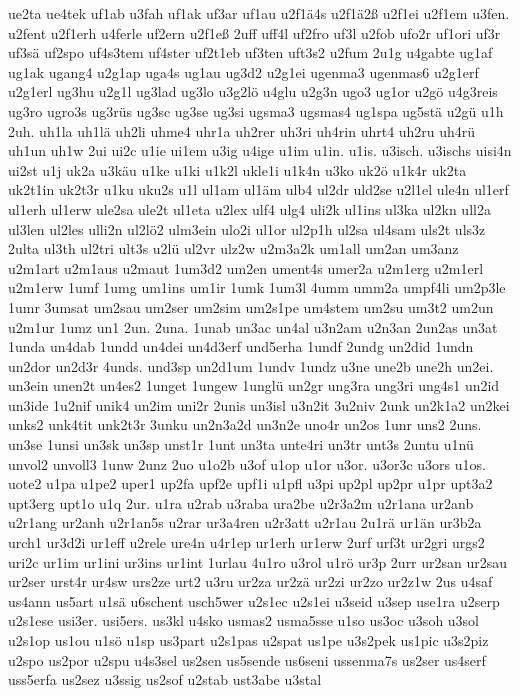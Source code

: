 {ue2ta
ue4tek
uf1ab
u3fah
uf1ak
uf3ar
uf1au
u2f1ä4s
u2f1ä2ß
u2f1ei
u2f1em
u3fen.
u2fent
u2f1erh
u4ferle
uf2ern
u2f1eß
2uff
uff4l
uf2fro
uf3l
u2fob
ufo2r
uf1ori
uf3r
uf3sä
uf2spo
uf4s3tem
uf4ster
uf2t1eb
uf3ten
uft3s2
u2fum
2u1g
u4gabte
ug1af
ug1ak
ugang4
u2g1ap
uga4s
ug1au
ug3d2
u2g1ei
ugenma3
ugenmas6
u2g1erf
u2g1erl
ug3hu
u2g1l
ug3lad
ug3lo
u3g2lö
u4glu
u2g3n
ugo3
ug1or
u2gö
u4g3reis
ug3ro
ugro3s
ug3rüs
ug3sc
ug3se
ug3si
ugsma3
ugsmas4
ug1spa
ug5stä
u2gü
u1h
2uh.
uh1la
uh1lä
uh2li
uhme4
uhr1a
uh2rer
uh3ri
uh4rin
uhrt4
uh2ru
uh4rü
uh1un
uh1w
2ui
ui2c
u1ie
ui1em
u3ig
u4ige
u1im
u1in.
u1is.
u3isch.
u3ischs
uisi4n
ui2st
u1j
uk2a
u3käu
u1ke
u1ki
u1k2l
ukle1i
u1k4n
u3ko
uk2ö
u1k4r
uk2ta
uk2t1in
uk2t3r
u1ku
uku2s
u1l
ul1am
ul1äm
ulb4
ul2dr
uld2se
u2l1el
ule4n
ul1erf
ul1erh
ul1erw
ule2sa
ule2t
ul1eta
u2lex
ulf4
ulg4
uli2k
ul1ins
ul3ka
ul2kn
ull2a
ul3len
ul2les
ulli2n
ul2lö2
ulm3ein
ulo2i
ul1or
ul2p1h
ul2sa
ul4sam
uls2t
uls3z
2ulta
ul3th
ul2tri
ult3s
u2lü
ul2vr
ulz2w
u2m3a2k
um1all
um2an
um3anz
u2m1art
u2m1aus
u2maut
1um3d2
um2en
ument4s
umer2a
u2m1erg
u2m1erl
u2m1erw
1umf
1umg
um1ins
um1ir
1umk
1um3l
4umm
umm2a
umpf4li
um2p3le
1umr
3umsat
um2sau
um2ser
um2sim
um2s1pe
um4stem
um2su
um3t2
um2un
u2m1ur
1umz
un1
2un.
2una.
1unab
un3ac
un4al
u3n2am
u2n3an
2un2as
un3at
1unda
un4dab
1undd
un4dei
un4d3erf
und5erha
1undf
2undg
un2did
1undn
un2dor
un2d3r
4unds.
und3sp
un2d1um
1undv
1undz
u3ne
une2b
une2h
un2ei.
un3ein
unen2t
un4es2
1unget
1ungew
1unglü
un2gr
ung3ra
ung3ri
ung4s1
un2id
un3ide
1u2nif
unik4
un2im
uni2r
2unis
un3isl
u3n2it
3u2niv
2unk
un2k1a2
un2kei
unks2
unk4tit
unk2t3r
3unku
un2n3a2d
un3n2e
uno4r
un2os
1unr
uns2
2uns.
un3se
1unsi
un3sk
un3sp
unst1r
1unt
un3ta
unte4ri
un3tr
unt3s
2untu
u1nü
unvol2
unvoll3
1unw
2unz
2uo
u1o2b
u3of
u1op
u1or
u3or.
u3or3c
u3ors
u1os.
uote2
u1pa
u1pe2
uper1
up2fa
upf2e
upf1i
u1pfl
u3pi
up2pl
up2pr
u1pr
upt3a2
upt3erg
upt1o
u1q
2ur.
u1ra
u2rab
u3raba
ura2be
u2r3a2m
u2r1ana
ur2anb
u2r1ang
ur2anh
u2r1an5s
u2rar
ur3a4ren
u2r3att
u2r1au
2u1rä
ur1än
ur3b2a
urch1
ur3d2i
ur1eff
u2rele
ure4n
u4r1ep
ur1erh
ur1erw
2urf
urf3t
ur2gri
urgs2
uri2c
ur1im
ur1ini
ur3ins
ur1int
1urlau
4u1ro
u3rol
u1rö
ur3p
2urr
ur2san
ur2sau
ur2ser
urst4r
ur4sw
urs2ze
urt2
u3ru
ur2za
ur2zä
ur2zi
ur2zo
ur2z1w
2us
u4saf
us4ann
us5art
u1sä
u6schent
usch5wer
u2s1ec
u2s1ei
u3seid
u3sep
use1ra
u2serp
u2s1ese
usi3er.
usi5ers.
us3kl
u4sko
usmas2
usma5sse
u1so
us3oc
u3soh
u3sol
u2s1op
us1ou
u1sö
u1sp
us3part
u2s1pas
u2spat
us1pe
u3s2pek
us1pic
u3s2piz
u2spo
us2por
u2spu
u4s3sel
us2sen
us5sende
us6seni
ussenma7s
us2ser
us4serf
uss5erfa
us2sez
u3ssig
us2sof
u2stab
ust3abe
u3stal
}
